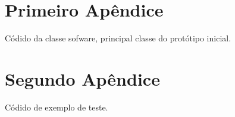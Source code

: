 \begin{apendicesenv}
\partapendices

\chapter{Primeiro Apêndice}
\label{apendice1}

Códido da classe sofware, principal classe do protótipo inicial.




\chapter{Segundo Apêndice}
\label{apendice2}

Códido de exemplo de teste.



\end{apendicesenv}
